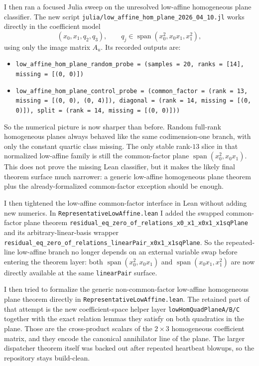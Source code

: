 \documentclass[11pt]{article}
\begin{document}
I then ran a focused Julia sweep on the unresolved low-affine homogeneous plane
classifier. The new script
\texttt{julia/low\_affine\_hom\_plane\_2026\_04\_10.jl} works directly in the
coefficient model
\[
  (x_0,x_1,q_2,q_3),
  \qquad
  q_j \in \operatorname{span}(x_0^2,x_0x_1,x_1^2),
\]
using only the image matrix \(A_u\). Its recorded outputs are:
\begin{itemize}
\item \texttt{low\_affine\_hom\_plane\_random\_probe = (samples = 20, ranks =
  [14], missing = [(0, 0)])}
\item \texttt{low\_affine\_hom\_plane\_control\_probe = (common\_factor =
  (rank = 13, missing = [(0, 0), (0, 4)]), diagonal = (rank = 14, missing =
  [(0, 0)]), split = (rank = 14, missing = [(0, 0)]))}
\end{itemize}
So the numerical picture is now sharper than before. Random full-rank
homogeneous planes always behaved like the same codimension-one branch, with
only the constant quartic class missing. The only stable rank-\(13\) slice in
that normalized low-affine family is still the common-factor plane
\(\operatorname{span}(x_0^2,x_0x_1)\). This does not prove the missing Lean
classifier, but it makes the likely final theorem surface much narrower: a
generic low-affine homogeneous plane theorem plus the already-formalized
common-factor exception should be enough.

I then tightened the low-affine common-factor interface in Lean without adding
new numerics. In \texttt{RepresentativeLowAffine.lean} I added the swapped
common-factor plane theorem
\texttt{residual\_eq\_zero\_of\_relations\_x0\_x1\_x0x1\_x1sqPlane} and its
arbitrary-linear-basis wrapper
\texttt{residual\_eq\_zero\_of\_relations\_linearPair\_x0x1\_x1sqPlane}. So
the repeated-line low-affine branch no longer depends on an external variable
swap before entering the theorem layer: both
\(\operatorname{span}(x_0^2,x_0x_1)\) and
\(\operatorname{span}(x_0x_1,x_1^2)\) are now directly available at the same
\texttt{linearPair} surface.

I then tried to formalize the generic non-common-factor low-affine homogeneous
plane theorem directly in \texttt{RepresentativeLowAffine.lean}. The retained
part of that attempt is the new coefficient-space helper layer
\texttt{lowHomQuadPlaneA/B/C} together with the exact relation lemmas they
satisfy on both quadratics in the plane. Those are the cross-product scalars of
the \(2 \times 3\) homogeneous coefficient matrix, and they encode the
canonical annihilator line of the plane. The larger dispatcher theorem itself
was backed out after repeated heartbeat blowups, so the repository stays
build-clean.
\end{document}
